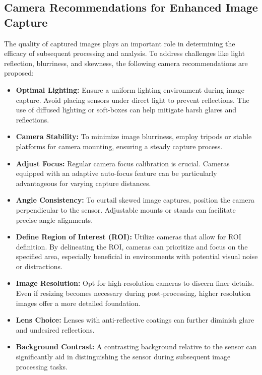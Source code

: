 \subsection{Camera Recommendations for Enhanced Image Capture}

The quality of captured images plays an important role in determining the efficacy of subsequent processing and analysis. To address challenges like light reflection, blurriness, and skewness, the following camera recommendations are proposed:

\begin{itemize}
    \item \textbf{Optimal Lighting:} Ensure a uniform lighting environment during image capture. Avoid placing sensors under direct light to prevent reflections. The use of diffused lighting or soft-boxes can help mitigate harsh glares and reflections.

    \item \textbf{Camera Stability:} To minimize image blurriness, employ tripods or stable platforms for camera mounting, ensuring a steady capture process.

    \item \textbf{Adjust Focus:} Regular camera focus calibration is crucial. Cameras equipped with an adaptive auto-focus feature can be particularly advantageous for varying capture distances.

    \item \textbf{Angle Consistency:} To curtail skewed image captures, position the camera perpendicular to the sensor. Adjustable mounts or stands can facilitate precise angle alignments.

    \item \textbf{Define Region of Interest (ROI):} Utilize cameras that allow for ROI definition. By delineating the ROI, cameras can prioritize and focus on the specified area, especially beneficial in environments with potential visual noise or distractions.

    \item \textbf{Image Resolution:} Opt for high-resolution cameras to discern finer details. Even if resizing becomes necessary during post-processing, higher resolution images offer a more detailed foundation.

    \item \textbf{Lens Choice:} Lenses with anti-reflective coatings can further diminish glare and undesired reflections.

    \item \textbf{Background Contrast:} A contrasting background relative to the sensor can significantly aid in distinguishing the sensor during subsequent image processing tasks.
\end{itemize}

